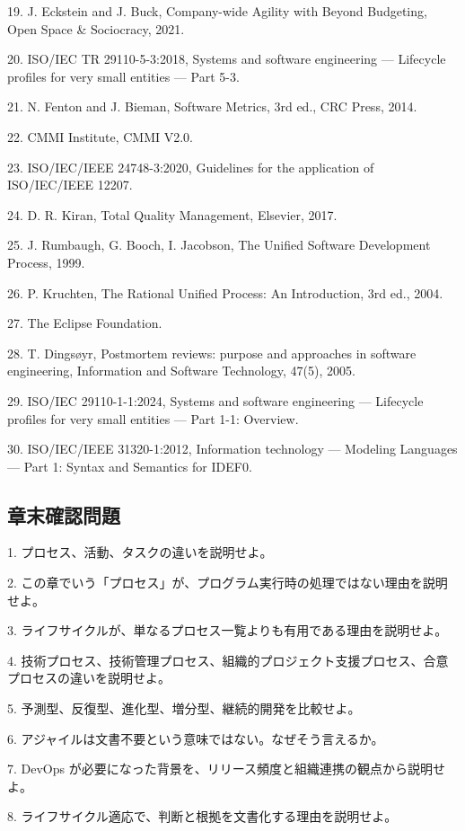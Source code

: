\documentclass[a4paper,11pt]{ltjsarticle}
\numberwithin{figure}{section}
\numberwithin{table}{section}
\begin{document}
19. J. Eckstein and J. Buck, Company-wide Agility with Beyond Budgeting, Open Space \& Sociocracy, 2021.

20. ISO/IEC TR 29110-5-3:2018, Systems and software engineering — Lifecycle profiles for very small entities — Part 5-3.

21. N. Fenton and J. Bieman, Software Metrics, 3rd ed., CRC Press, 2014.

22. CMMI Institute, CMMI V2.0.

23. ISO/IEC/IEEE 24748-3:2020, Guidelines for the application of ISO/IEC/IEEE 12207.

24. D. R. Kiran, Total Quality Management, Elsevier, 2017.

25. J. Rumbaugh, G. Booch, I. Jacobson, The Unified Software Development Process, 1999.

26. P. Kruchten, The Rational Unified Process: An Introduction, 3rd ed., 2004.

27. The Eclipse Foundation.

28. T. Dingsøyr, Postmortem reviews: purpose and approaches in software engineering, Information and Software Technology, 47(5), 2005.

29. ISO/IEC 29110-1-1:2024, Systems and software engineering — Lifecycle profiles for very small entities — Part 1-1: Overview.

30. ISO/IEC/IEEE 31320-1:2012, Information technology — Modeling Languages — Part 1: Syntax and Semantics for IDEF0.

\subsection{章末確認問題}
1. プロセス、活動、タスクの違いを説明せよ。

2. この章でいう「プロセス」が、プログラム実行時の処理ではない理由を説明せよ。

3. ライフサイクルが、単なるプロセス一覧よりも有用である理由を説明せよ。

4. 技術プロセス、技術管理プロセス、組織的プロジェクト支援プロセス、合意プロセスの違いを説明せよ。

5. 予測型、反復型、進化型、増分型、継続的開発を比較せよ。

6. アジャイルは文書不要という意味ではない。なぜそう言えるか。

7. DevOps が必要になった背景を、リリース頻度と組織連携の観点から説明せよ。

8. ライフサイクル適応で、判断と根拠を文書化する理由を説明せよ。
\end{document}
